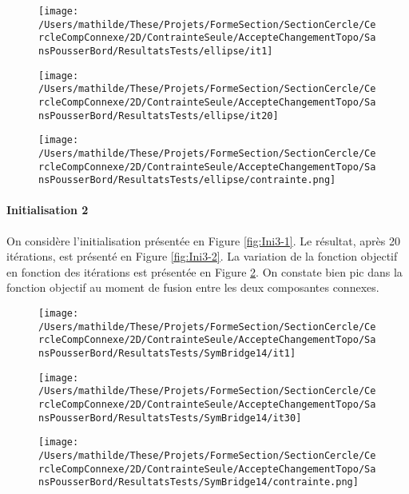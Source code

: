 \documentclass[11pt,a4paper]{article}
\begin{document}
\begin{figure}[H]
	\begin{minipage}{0.33\textwidth}
		\centering
		\texttt{[image: /Users/mathilde/These/Projets/FormeSection/SectionCercle/CercleCompConnexe/2D/ContrainteSeule/AccepteChangementTopo/SansPousserBord/ResultatsTests/ellipse/it1]}
		\label{fig:Ini1-1}
	\end{minipage}
	\begin{minipage}{0.33\textwidth}
		\centering
		\texttt{[image: /Users/mathilde/These/Projets/FormeSection/SectionCercle/CercleCompConnexe/2D/ContrainteSeule/AccepteChangementTopo/SansPousserBord/ResultatsTests/ellipse/it20]}
		\label{fig:Ini1-2}
	\end{minipage}
	\begin{minipage}{0.33\textwidth}
		\centering
		\texttt{[image: /Users/mathilde/These/Projets/FormeSection/SectionCercle/CercleCompConnexe/2D/ContrainteSeule/AccepteChangementTopo/SansPousserBord/ResultatsTests/ellipse/contrainte.png]}
		\label{fig:Ini1-3}
	\end{minipage}
\end{figure}


\paragraph{Initialisation 2}

\vspace{0cm}

On considère l'initialisation présentée en Figure \ref{fig:Ini3-1}. Le résultat, après 20 itérations, est présenté en Figure \ref{fig:Ini3-2}. La variation de la fonction objectif en fonction des itérations est présentée en Figure \ref{fig:Ini3-3}. On constate bien pic dans la fonction objectif au moment de fusion entre les deux composantes connexes.

\begin{figure}[H]
	\begin{minipage}{0.33\textwidth}
		\centering
		\texttt{[image: /Users/mathilde/These/Projets/FormeSection/SectionCercle/CercleCompConnexe/2D/ContrainteSeule/AccepteChangementTopo/SansPousserBord/ResultatsTests/SymBridge14/it1]}
		\label{fig:Ini3-1}
	\end{minipage}
	\begin{minipage}{0.33\textwidth}
		\centering
		\texttt{[image: /Users/mathilde/These/Projets/FormeSection/SectionCercle/CercleCompConnexe/2D/ContrainteSeule/AccepteChangementTopo/SansPousserBord/ResultatsTests/SymBridge14/it30]}
		\label{fig:Ini3-2}
	\end{minipage}
	\begin{minipage}{0.33\textwidth}
		\centering
		\texttt{[image: /Users/mathilde/These/Projets/FormeSection/SectionCercle/CercleCompConnexe/2D/ContrainteSeule/AccepteChangementTopo/SansPousserBord/ResultatsTests/SymBridge14/contrainte.png]}
		\label{fig:Ini3-3}
	\end{minipage}
\end{figure}
\end{document}
